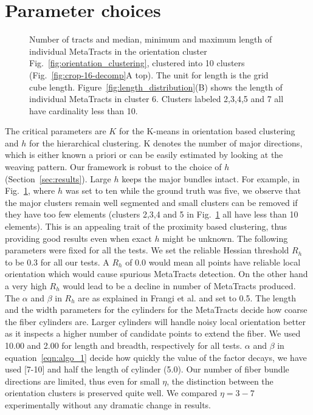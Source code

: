 \section{Parameter choices}
\label{sec:param_choices}
\begin{figure}
\centering
	\caption{Number of tracts and median, minimum and maximum length of individual MetaTracts in the orientation cluster Fig.~\ref{fig:orientation_clustering}, clustered into 10 clusters (Fig.~\ref{fig:crop-16-decomp}A top). The unit for length is the grid cube length. Figure~\ref{fig:length_distribution}(B) shows the length of individual MetaTracts in cluster 6. Clusters labeled 2,3,4,5 and 7 all have cardinality less than 10. }
	\label{fig:len_dist_crop16}
\end{figure}
The critical parameters are $K$ for the K-means in orientation based clustering and $h$ for the hierarchical clustering. K denotes the number of major directions, which is either known a priori or can be easily estimated by looking at the weaving pattern. 
Our framework is robust to the choice of $h$ (Section~\ref{sec:results}). Large $h$ keeps the major bundles intact. For example, in  Fig.~\ref{fig:len_dist_crop16}, where $h$ was set to ten while the ground truth was five, we observe that the major clusters remain well segmented and small clusters can be removed if they have too few elements (clusters 2,3,4 and 5 in Fig.~\ref{fig:len_dist_crop16} all have less than 10 elements). This is an appealing trait of the proximity based clustering, thus providing good results even when exact $h$ might be unknown.
The following parameters were fixed for all the tests. We set the reliable Hessian threshold $R_{h}$ to be 0.3 for all our tests. A $R_{h}$ of 0.0 would mean all points have reliable local orientation which would cause spurious MetaTracts detection. On the other hand a very high $ R_{h}$ would lead to be a decline in number of MetaTracts produced. The $\alpha$ and $\beta$ in $R_{h}$ are as explained in Frangi et al. \cite{Frangi1998} and set to 0.5. The length and the width parameters for the cylinders for the MetaTracts decide how coarse the fiber cylinders are. Larger cylinders will handle noisy local orientation better as it inspects a higher number of candidate points to extend the fiber. We used 10.00 and 2.00 for length and breadth, respectively for all tests. $\alpha$ and $\beta$ in equation~\ref{eqn:algo_1} decide how quickly the value of the factor decays, we have used [7-10] and half the length of cylinder (5.0). Our number of fiber bundle directions are limited, thus even for small $\eta$, the distinction between the orientation clusters is preserved quite well. We compared  $\eta=3-7$ experimentally without any dramatic change in results. 
